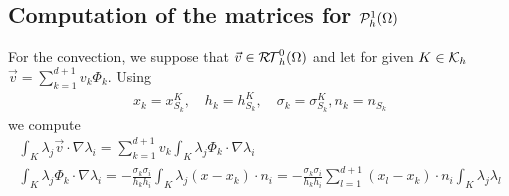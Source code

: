 %
\subsection{Computation of the matrices for $\mathcal{P}_h^1(\Omega)$}\label{subsec:}
%
For the convection, we suppose that $\vec{v}\in \mathcal{R\!T}^0_h(\Omega)$ and let for given $K\in\mathcal K_h$ 
$\vec{v}=\sum_{k=1}^{d+1} v_k \Phi_k$. Using
%
\begin{align*}
x_k = x_{S_k}^K,\quad h_k = h_{S_k}^K, \quad \sigma_k = \sigma_{S_k}^K, n_k = n_{S_k}
\end{align*}
%
we compute
%
\begin{align*}
\int_K \lambda_j \vec{v}\cdot \nabla \lambda_i = \sum_{k=1}^{d+1} v_k \int_K \lambda_j \Phi_k\cdot \nabla \lambda_i\\
\int_K \lambda_j \Phi_k\cdot \nabla \lambda_i = -\frac{\sigma_k \sigma_i}{h_kh_i} \int_K  \lambda_j (x-x_k) \cdot n_i
= -\frac{\sigma_k \sigma_i}{h_kh_i} \sum_{l=1}^{d+1} (x_l-x_k) \cdot n_i \int_K  \lambda_j\lambda_l 
\end{align*}
%




\printbibliography[title=References Section~\thesection]



